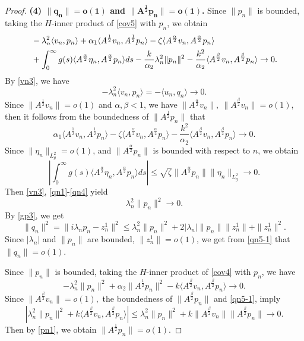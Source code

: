 \documentclass[10pt,a4paper]{amsart}
\begin{document}
\begin{proof}
		{\bf \noindent(4) $\bm{\|q_n\|=o(1)}$ and $\bm{\|A^{\frac{1}{2}} p_n\|=o(1)}$.} Since $\|p_n\|$ is bounded, taking the $H$-inner product of \eqref{cov5} with $p_n$, we obtain
		\begin{align}\label{qn1}
			&-\lambda_n^2 \langle v_n, p_n \rangle
			+ \alpha_1 \langle A^{\frac{1}{2}} v_n, A^{\frac{1}{2}} p_n \rangle
			- \zeta \langle A^{\frac{\alpha}{2}} v_n, A^{\frac{\alpha}{2}} p_n \rangle \notag \\
			&+ \int_0^\infty g(s) \langle A^{\frac{\alpha}{2}} \eta_n, A^{\frac{\alpha}{2}} p_n \rangle ds
			- \frac{k}{\alpha_2} \lambda_n^2 \|p_n\|^2
			- \frac{k^2}{\alpha_2} \langle A^{\frac{\beta}{2}} v_n, A^{\frac{\beta}{2}} p_n \rangle
			\to 0.
		\end{align}
		By \eqref{vn3}, we have
		\begin{equation}\label{qn2}
			-\lambda_n^2 \langle v_n, p_n \rangle = -\langle u_n, q_n \rangle \to 0.
		\end{equation}
		Since $\| A^{\frac{1}{2}} v_n \|=o(1)$ and $\alpha,\beta<1$, we have $\| A^{\frac{\alpha}{2}} v_n \|,~\| A^{\frac{\beta}{2}} v_n \|=o(1)$, then it follows from the  boundedness of $\|A^{\frac{1}{2}} p_n\|$ that
		\begin{equation}\label{qn3}
			\alpha_1 \langle A^{\frac{1}{2}} v_n, A^{\frac{1}{2}} p_n \rangle
			- \zeta \langle A^{\frac{\alpha}{2}} v_n, A^{\frac{\alpha}{2}} p_n \rangle
			- \frac{k^2}{\alpha_2} \langle A^{\frac{\beta}{2}} v_n, A^{\frac{\beta}{2}} p_n \rangle
			\to 0.
		\end{equation}
		Since $\|\eta_n\|_{L_g^2}=o(1)$, and $\| A^{\frac{\alpha}{2}} p_n \|$ is bounded with respect to $n$, we obtain
		\begin{equation}\label{qn4}
			\left| \int_0^\infty g(s) \langle A^{\frac{\alpha}{2}} \eta_n, A^{\frac{\alpha}{2}} p_n \rangle ds \right| \leq \sqrt{\zeta} \|A^{\frac{\alpha}{2}} p_n\|\|\eta_n\|_{L_g^2} \to 0.
		\end{equation}
Then \eqref{vn3}, \eqref{qn1}-\eqref{qn4} yield
\begin{equation}\label{qn5-1}
		\lambda_n^2 \|p_n\|^2 \to 0.
		\end{equation}
By \eqref{gp3}, we get $$\|q_n\|^2=\|i\lambda_np_n-z_n^1\|^2\le\lambda_n^2\|p_n\|^2+2|\lambda_n|\|p_n\|\|z_n^1\|+\|z_n^1\|^2.$$
Since $|\lambda_n|$ and $\|p_n\|$ are bounded, $\|z_n^1\|=o(1)$, we get from \eqref{qn5-1} that $\|q_n\|=o(1)$.
		
Since $\|p_n\|$ is bounded, taking the $H$-inner product of \eqref{cov4} with $p_n$, we have
		\begin{equation}\label{pn1}
			-\lambda_n^2 \|p_n\|^2 + \alpha_2 \|A^{\frac{1}{2}}p_n\|^2 - k \langle A^{\frac{\beta}{2}}v_n, A^{\frac{\beta}{2}}p_n \rangle \to 0.
		\end{equation}
Since $\| A^{\frac{\beta}{2}} v_n \|=o(1),$ the boundedness of $\|A^{\frac{\beta}{2}} p_n\|$ and \eqref{qn5-1}, imply
$$\left|\lambda_n^2 \|p_n\|^2+k \langle A^{\frac{\beta}{2}}v_n, A^{\frac{\beta}{2}}p_n \rangle\right|\le\lambda_n^2 \|p_n\|^2+k\|A^{\frac{\beta}{2}}v_n\|\|A^{\frac{\beta}{2}}p_n\|\to0.$$
Then by \eqref{pn1}, we obtain $\|A^{\frac{1}{2}} p_n\|=o(1)$.
		

\end{proof}
\end{document}
